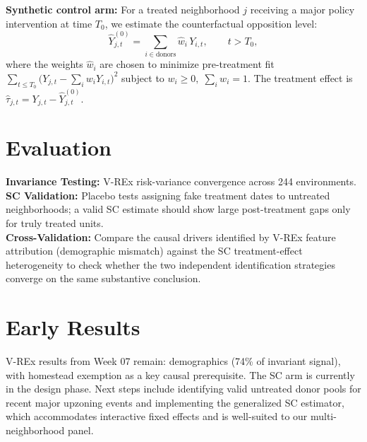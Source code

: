 \documentclass[11pt,twoside]{article}
\begin{document}
\textbf{Synthetic control arm:} For a treated neighborhood $j$ receiving a major policy intervention at time $T_0$, we estimate the counterfactual opposition level:
\[
  \hat{Y}_{j,t}^{(0)} = \sum_{i \in \text{donors}} \hat{w}_i \, Y_{i,t}, \qquad t > T_0,
\]
where the weights $\hat{w}_i$ are chosen to minimize pre-treatment fit $\sum_{t \leq T_0} \bigl(Y_{j,t} - \sum_i w_i Y_{i,t}\bigr)^2$ subject to $w_i \geq 0,\;\sum_i w_i = 1$. The treatment effect is $\hat{\tau}_{j,t} = Y_{j,t} - \hat{Y}_{j,t}^{(0)}$.

\section*{Evaluation}
\textbf{Invariance Testing:} V-REx risk-variance convergence across 244 environments. \\
\textbf{SC Validation:} Placebo tests assigning fake treatment dates to untreated neighborhoods; a valid SC estimate should show large post-treatment gaps only for truly treated units. \\
\textbf{Cross-Validation:} Compare the causal drivers identified by V-REx feature attribution (demographic mismatch) against the SC treatment-effect heterogeneity to check whether the two independent identification strategies converge on the same substantive conclusion.

\section*{Early Results}
V-REx results from Week 07 remain: demographics (74\% of invariant signal), with homestead exemption as a key causal prerequisite. The SC arm is currently in the design phase. Next steps include identifying valid untreated donor pools for recent major upzoning events and implementing the \citet{xu2017gsynth} generalized SC estimator, which accommodates interactive fixed effects and is well-suited to our multi-neighborhood panel.

\vspace{-0.5em}
{\scriptsize


}
\end{document}
